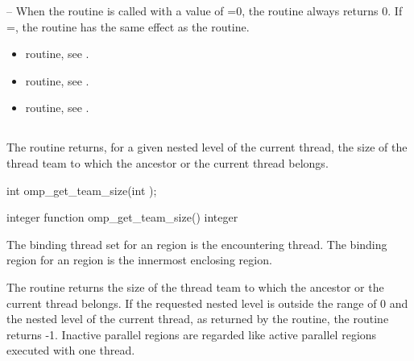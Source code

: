 \notestart
\noteheader -- When the  routine is called with a value 
of =0, the routine always returns 0. If =, the routine 
has the same effect as the  routine. 
\noteend

\crossreferences
\begin{itemize}
\item {} routine, see 
.

\item {} routine, see 
.

\item {} routine, see 
.
\end{itemize}










\subsection{}
\label{subsec:omp_get_team_size}
\summary
The  routine returns, for a given nested level of the current 
thread, the size of the thread team to which the ancestor or the current thread belongs. 

\format
\ccppspecificstart
\begin{boxedcode}
int omp\_get\_team\_size(int );
\end{boxedcode}
\ccppspecificend

\fortranspecificstart
\begin{boxedcode}
integer function omp\_get\_team\_size()
integer 
\end{boxedcode}
\fortranspecificend

\binding
The binding thread set for an  region is the encountering 
thread. The binding region for an  region is the innermost 
enclosing  region.

\effect
The  routine returns the size of the thread team to which the 
ancestor or the current thread belongs. If the requested nested level is outside the range 
of 0 and the nested level of the current thread, as returned by the  
routine, the routine returns -1. Inactive parallel regions are regarded like active parallel 
regions executed with one thread. 


